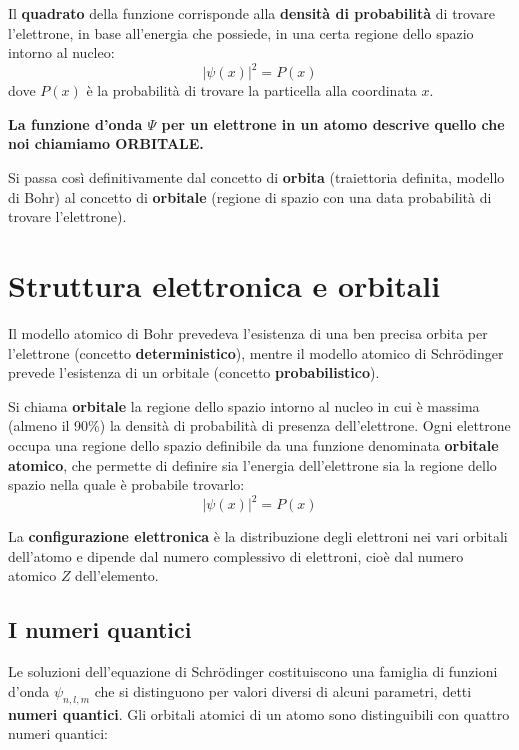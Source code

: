 \documentclass[11pt, a4paper, openright]{book}
\begin{document}
Il \textbf{quadrato} della funzione corrisponde alla \textbf{densità di probabilità} di trovare l'elettrone, in base all'energia che possiede, in una certa regione dello spazio intorno al nucleo:
\[
\left| \psi(x) \right|^{2} = P(x)
\]
dove $P(x)$ è la probabilità di trovare la particella alla coordinata $x$.

\begin{center}
\textbf{La funzione d'onda $\Psi$ per un elettrone in un atomo descrive quello che noi chiamiamo ORBITALE.}
\end{center}

Si passa così definitivamente dal concetto di \textbf{orbita} (traiettoria definita, modello di Bohr) al concetto di \textbf{orbitale} (regione di spazio con una data probabilità di trovare l'elettrone).

\newpage

\section{Struttura elettronica e orbitali}
Il modello atomico di Bohr prevedeva l'esistenza di una ben precisa orbita per l'elettrone (concetto \textbf{deterministico}), mentre il modello atomico di Schrödinger prevede l'esistenza di un orbitale (concetto \textbf{probabilistico}).

Si chiama \textbf{orbitale} la regione dello spazio intorno al nucleo in cui è massima (almeno il 90\%) la densità di probabilità di presenza dell'elettrone. Ogni elettrone occupa una regione dello spazio definibile da una funzione denominata \textbf{orbitale atomico}, che permette di definire sia l'energia dell'elettrone sia la regione dello spazio nella quale è probabile trovarlo:
\[
\left| \psi(x) \right|^{2} = P(x)
\]

La \textbf{configurazione elettronica} è la distribuzione degli elettroni nei vari orbitali dell'atomo e dipende dal numero complessivo di elettroni, cioè dal numero atomico $Z$ dell'elemento.

\subsection{I numeri quantici}
Le soluzioni dell'equazione di Schrödinger costituiscono una famiglia di funzioni d'onda $\psi_{n,l,m}$ che si distinguono per valori diversi di alcuni parametri, detti \textbf{numeri quantici}. Gli orbitali atomici di un atomo sono distinguibili con quattro numeri quantici:
\end{document}

